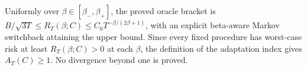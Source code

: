 Uniformly over \(\beta\in[\beta_-,\beta_+]\), the proved oracle bracket is \(B/\sqrt{3T}\le R_T(\beta;C)\le C_0T^{-\beta/(2\beta+1)}\), with an explicit beta-aware Markov switchback attaining the upper bound. Since every fixed procedure has worst-case risk at least \(R_T(\beta;C)>0\) at each \(\beta\), the definition of the adaptation index gives \(A_T(C)\ge1\). No divergence beyond one is proved.